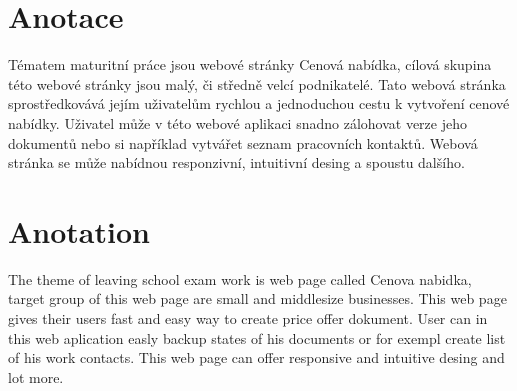 \section*{Anotace}
 	Tématem maturitní práce jsou webové stránky Cenová nabídka, cílová skupina této webové stránky jsou malý, či středně velcí podnikatelé. Tato webová stránka sprostředkovává jejím uživatelům rychlou a jednoduchou cestu k vytvoření cenové nabídky. Uživatel může v této webové aplikaci snadno zálohovat verze jeho dokumentů nebo si například vytvářet seznam pracovních kontaktů. Webová stránka se může nabídnou responzivní, intuitivní desing a spoustu dalšího.  
 	\newpage
 	\section*{Anotation}
 	The theme of leaving school exam work is web page called Cenova nabidka, target group of this web page are small and middlesize businesses. This web page gives their users fast and easy way to create price offer dokument. User can in this web aplication easly backup states of his documents or for exempl create list of his work contacts. This web page can offer responsive and intuitive desing and lot more.
 	\newpage